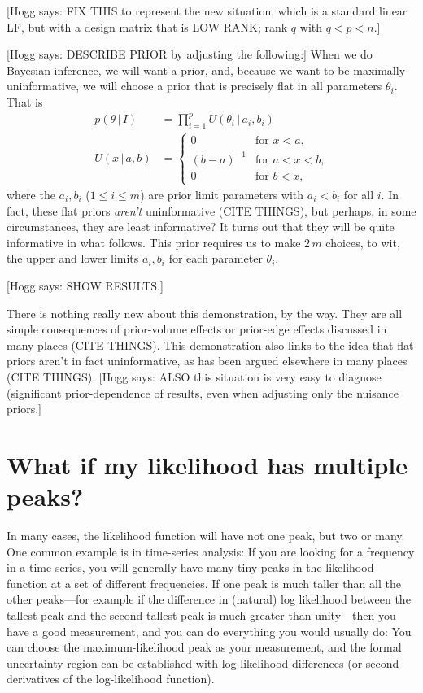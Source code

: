 \documentclass{article}
\newcommand{\given}{\,|\,}
\newcommand{\hogg}[1]{{\color{blue}[Hogg says: {#1}]}}
\begin{document}
\hogg{FIX THIS to represent the new situation, which is a standard linear LF, but with a design matrix that is LOW RANK; rank $q$ with $q<p<n$.}

\hogg{DESCRIBE PRIOR by adjusting the following:}
When we do Bayesian inference, we will want a prior, and, because we want to be maximally uninformative, we will choose a prior that is precisely flat in all parameters $\theta_i$.
That is
\begin{align}
    p(\theta\given I) &= \prod_{i=1}^p U(\theta_i\given a_i, b_i) \\
    U(x\given a, b) & = \left\{\begin{array}{cl}
    0 & \mbox{for $x<a$,} \\
    (b-a)^{-1} & \mbox{for $a<x<b$,} \\
    0 & \mbox{for $b<x$,}\end{array}\right.
\end{align}
where the $a_i, b_i$ ($1\leq i\leq m$) are prior limit parameters with $a_i<b_i$ for all $i$.
In fact, these flat priors \emph{aren't} uninformative (CITE THINGS), but perhaps, in some circumstances, they are least informative?
It turns out that they will be quite informative in what follows.
This prior requires us to make $2\,m$ choices, to wit, the upper and lower limits $a_i, b_i$ for each parameter $\theta_i$.

\hogg{SHOW RESULTS.}

There is nothing really new about this demonstration, by the way.
They are all simple consequences of prior-volume effects or prior-edge effects discussed in many places (CITE THINGS).
This demonstration also links to the idea that flat priors aren't in fact uninformative, as has been argued elsewhere in many places (CITE THINGS).
\hogg{ALSO this situation is very easy to diagnose (significant prior-dependence of results, even when adjusting only the nuisance priors.}

\section{What if my likelihood has multiple peaks?}\label{sec:multiple}
In many cases, the likelihood function will have not one peak, but two or many.
One common example is in time-series analysis:
If you are looking for a frequency in a time series, you will generally have many tiny peaks in the likelihood function at a set of different frequencies.
If one peak is much taller than all the other peaks---for example if the difference in (natural) log likelihood between the tallest peak and the second-tallest peak is much greater than unity---then you have a good measurement, and you can do everything you would usually do:
You can choose the maximum-likelihood peak as your measurement, and the formal uncertainty region can be established with log-likelihood differences (or second derivatives of the log-likelihood function).
\end{document}
